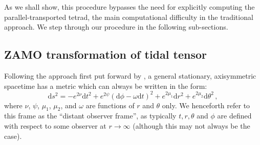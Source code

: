\documentclass[
    reprint,
    prd,
    nofootinbib,
    amsmath,amssymb,
    aps,
    floatfix,
]{revtex4-2}
\begin{document}
As we shall show, this procedure bypasses the need for explicitly computing the parallel-transported tetrad, the main computational difficulty in the traditional approach. We step through our procedure in the following sub-sections. 

\subsection{ZAMO transformation of tidal tensor} \label{sec:zamo}

Following the approach first put forward by \cite{Bardeen1972}, a general stationary, axisymmetric spacetime has a metric which can always be written in the form:
\begin{equation}
    \mathrm{d}s^{2} = -e^{2\nu} \mathrm{d}t^{2} + e^{2\psi} \left( \mathrm{d}\phi - \omega \mathrm{d}t \right)^{2} + e^{2\mu_{1}} \mathrm{d}r^{2} + e^{2\mu_{2}} \mathrm{d}\theta^{2} \, ,
    \label{eq:metric}
\end{equation}
where $\nu$, $\psi$, $\mu_{1}$, $\mu_{2}$, and $\omega$ are functions of $r$ and $\theta$ only. We henceforth refer to this frame as the ``distant observer frame'', as typically $t, r, \theta$ and $\phi$ are defined with respect to some observer at $r\to\infty$ (although this may not always be the case). 
\end{document}
